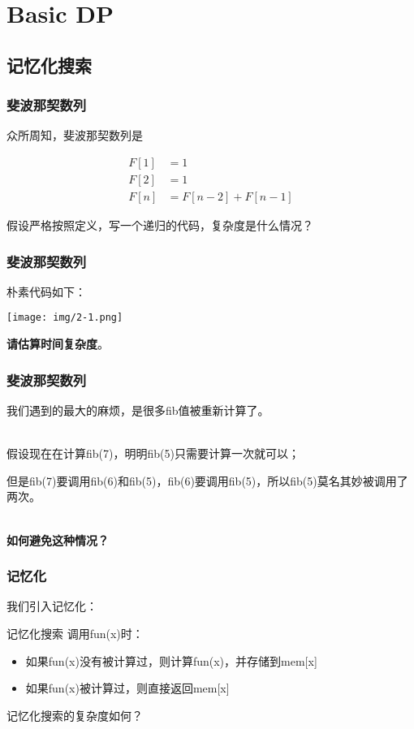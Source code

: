 \documentclass{beamer}
\begin{document}
\section{Basic DP}

\subsection{记忆化搜索}

\begin{frame}
    \frametitle{斐波那契数列}

    众所周知，斐波那契数列是

    \[
        \begin{aligned}
            F[1]&=1 \\
            F[2]&=1 \\
            F[n]&=F[n-2]+F[n-1] 
        \end{aligned}\]

    假设严格按照定义，写一个递归的代码，复杂度是什么情况？

\end{frame}

\begin{frame}
    \frametitle{斐波那契数列}

    朴素代码如下：

    \texttt{[image: img/2-1.png]}

    \textbf{请估算时间复杂度}。

\end{frame}

\begin{frame}
    \frametitle{斐波那契数列}

    我们遇到的最大的麻烦，是很多fib值被重新计算了。

    ~\\

    假设现在在计算fib(7)，明明fib(5)只需要计算一次就可以；
    
    但是fib(7)要调用fib(6)和fib(5)，fib(6)要调用fib(5)，所以fib(5)莫名其妙被调用了两次。
    
    ~\\

    \textbf{如何避免这种情况？}

\end{frame}

\begin{frame}
    \frametitle{记忆化}

    我们引入记忆化：

    \begin{block}{记忆化搜索}
        调用fun(x)时：
        \begin{itemize}
            \item 如果fun(x)没有被计算过，则计算fun(x)，并存储到mem[x]
            \item 如果fun(x)被计算过，则直接返回mem[x]
        \end{itemize}
    \end{block}

    记忆化搜索的复杂度如何？

\end{frame}
\end{document}
